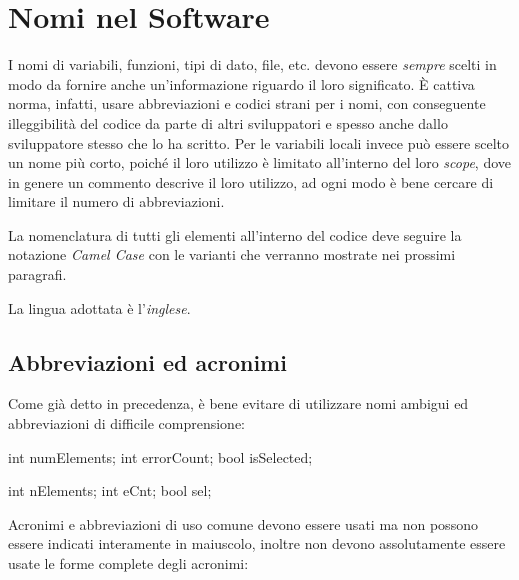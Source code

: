 %

\section{Nomi nel Software}\label{sec:name}

I nomi di variabili, funzioni, tipi di dato, file, etc. devono essere \emph{sempre} scelti in modo da fornire anche un'informazione riguardo il loro significato.
È cattiva norma, infatti, usare abbreviazioni e codici strani per i nomi, con conseguente illeggibilità del codice da parte di altri sviluppatori e spesso anche dallo sviluppatore stesso che lo ha scritto.
Per le variabili locali invece può essere scelto un nome più corto, poiché il loro utilizzo è limitato all'interno del loro \emph{scope}, dove in genere un commento descrive il loro utilizzo, ad ogni modo è bene cercare di limitare il numero di abbreviazioni. 

La nomenclatura di tutti gli elementi all'interno del codice deve seguire la notazione \emph{Camel Case}\cite{codestyle:camel} con le varianti che verranno mostrate nei prossimi paragrafi.

La lingua adottata è l'\emph{inglese}.

\subsection{Abbreviazioni ed acronimi}\label{ssec:abbreviations}

Come già detto in precedenza, è bene evitare di utilizzare nomi ambigui ed abbreviazioni di difficile comprensione:

\begin{minipage}[t]{\cbwidth}
\begin{RightCode}
int numElements;
int errorCount;
bool isSelected;
\end{RightCode}
\end{minipage}%
\hspace{\cbdistance}
\begin{minipage}[t]{\cbwidth}
\begin{ErrorCode}
int nElements;
int eCnt;
bool sel;
\end{ErrorCode}
\end{minipage}

Acronimi e abbreviazioni di uso comune devono essere usati ma non possono essere indicati interamente in maiuscolo, inoltre non devono assolutamente essere usate le forme complete degli acronimi:

